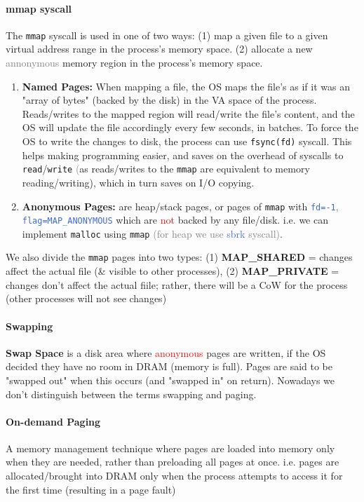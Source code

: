\documentclass[openany,12pt]{book}
\newcommand{\code}[1]{\texttt{#1}}
\newcommand{\red}[1]{\textcolor{Red}{#1}}
\newcommand{\blue}[1]{\textcolor{RoyalBlue}{#1}}
\newcommand{\gray}[1]{\textcolor{gray}{#1}}
\begin{document}
\paragraph{mmap syscall} The \code{mmap} syscall is used in one of two ways: (1) map a given file to a given virtual address range in the process's memory space. (2) allocate a new \gray{annonymous} memory region in the process's memory space. 
\begin{enumerate}
  \item \textbf{Named Pages:} When mapping a file, the OS maps the file's as if it was an "array of bytes" (backed by the disk) in the VA space of the process. Reads/writes to the mapped region will read/write the file's content, and the OS will update the file accordingly every few seconds, in batches. To force the OS to write the changes to disk, the process can use \code{fsync(fd)} syscall. This helps making programming easier, and saves on the overhead of syscalls to \code{read}/\code{write} \gray(as reads/writes to the \code{mmap} are equivalent to memory reading/writing), which in turn saves on I/O copying.

  \item \textbf{Anonymous Pages:} are heap/stack pages, or pages of \code{mmap} with \blue{\code{fd=-1}, \code{flag=MAP\_ANONYMOUS}} which are \red{not} backed by any file/disk. i.e. we can implement \code{malloc} using \code{mmap} \gray{(for heap we use} \blue{sbrk} \gray{syscall)}.
\end{enumerate}
We also divide the \code{mmap} pages into two types: (1) \textbf{MAP\_SHARED} = changes affect the actual file (\& visible to other processes), (2) \textbf{MAP\_PRIVATE} = changes don't affect the actual fiile; rather, there will be a CoW for the process (other processes will not see changes)

\paragraph{Swapping} \textbf{Swap Space} is a disk area where \red{anonymous} pages are written, if the OS decided they have no room in DRAM (memory is full). Pages are said to be "swapped out" when this occurs (and "swapped in" on return). Nowadays we don't distinguish between the terms swapping and paging.


\paragraph{On-demand Paging} A memory management technique where pages are loaded into memory only when they are needed, rather than preloading all pages at once. i.e. pages are allocated/brought into DRAM only when the process attempts to access it for the first time (resulting in a page fault)
\end{document}
